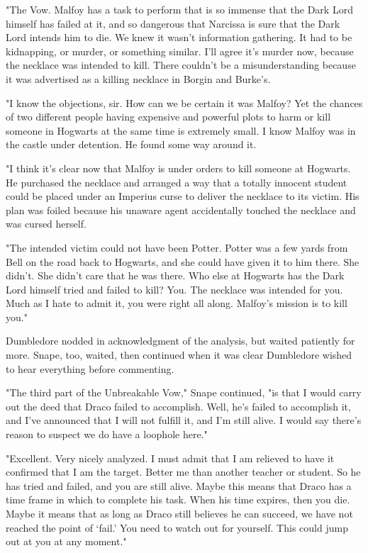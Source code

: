 "The Vow. Malfoy has a task to perform that is so immense that the Dark Lord himself has failed at it, and so dangerous that Narcissa is sure that the Dark Lord intends him to die. We knew it wasn't information gathering. It had to be kidnapping, or murder, or something similar. I'll agree it's murder now, because the necklace was intended to kill. There couldn't be a misunderstanding because it was advertised as a killing necklace in Borgin and Burke's.

"I know the objections, sir. How can we be certain it was Malfoy? Yet the chances of two different people having expensive and powerful plots to harm or kill someone in Hogwarts at the same time is extremely small. I know Malfoy was in the castle under detention. He found some way around it.

"I think it's clear now that Malfoy is under orders to kill someone at Hogwarts. He purchased the necklace and arranged a way that a totally innocent student could be placed under an Imperius curse to deliver the necklace to its victim. His plan was foiled because his unaware agent accidentally touched the necklace and was cursed herself.

"The intended victim could not have been Potter. Potter was a few yards from Bell on the road back to Hogwarts, and she could have given it to him there. She didn't. She didn't care that he was there. Who else at Hogwarts has the Dark Lord himself tried and failed to kill? You. The necklace was intended for you. Much as I hate to admit it, you were right all along. Malfoy's mission is to kill you."

Dumbledore nodded in acknowledgment of the analysis, but waited patiently for more. Snape, too, waited, then continued when it was clear Dumbledore wished to hear everything before commenting.

"The third part of the Unbreakable Vow," Snape continued, "is that I would carry out the deed that Draco failed to accomplish. Well, he's failed to accomplish it, and I've announced that I will not fulfill it, and I'm still alive. I would say there's reason to suspect we do have a loophole here."

"Excellent. Very nicely analyzed. I must admit that I am relieved to have it confirmed that I am the target. Better me than another teacher or student. So he has tried and failed, and you are still alive. Maybe this means that Draco has a time frame in which to complete his task. When his time expires, then you die. Maybe it means that as long as Draco still believes he can succeed, we have not reached the point of `fail.' You need to watch out for yourself. This could jump out at you at any moment."

